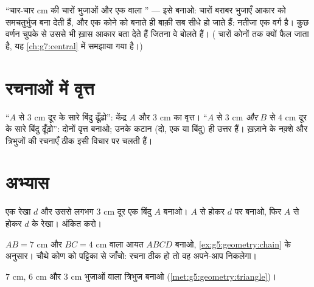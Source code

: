 \begin{example}[वर्णन से पहचानना]\label{ex:g5:geometry:recognize}
``चार-चार cm की चारों भुजाओं और एक  वाला '' ---
इसे बनाओ: चारों बराबर भुजाएँ आकार को समचतुर्भुज बना देती हैं, और
एक कोने को  बनाते ही बाक़ी सब सीधे हो जाते हैं: नतीजा एक
वर्ग है। कुछ वर्णन चुपके से उससे भी ख़ास आकार बता देते हैं जितना
वे बोलते हैं। ( चारों कोनों तक क्यों फैल जाता है, यह
\cref{ch:g7:central} में समझाया गया है।)
\end{example}

\section{रचनाओं में वृत्त}

\begin{example}[औज़ार के रूप में वृत्त]\label{ex:g5:geometry:circle}
``$A$ से $3$ cm दूर के सारे बिंदु ढूँढ़ो'': केंद्र $A$ और
 $3$ cm का वृत्त। ``$A$ से $3$ cm \emph{और} $B$ से
$4$ cm दूर के सारे बिंदु ढूँढ़ो'': दोनों वृत्त बनाओ; उनके कटान
(दो, एक या  बिंदु) ही उत्तर हैं। ख़ज़ाने के नक़्शे और
त्रिभुजों की रचनाएँ ठीक इसी विचार पर चलती हैं।
\end{example}

\section{अभ्यास}

\begin{exercise}[$\star$]\label{exo:g5:geometry:1}
एक रेखा $d$ और उससे लगभग $3$ cm दूर एक बिंदु $A$ बनाओ। $A$ से
होकर $d$ पर  बनाओ, फिर $A$ से होकर $d$ के  रेखा।
 अंकित करो।
\end{exercise}

\begin{exercise}[$\star$]\label{exo:g5:geometry:2}
$AB = 7$ cm और $BC = 4$ cm वाला आयत $ABCD$ बनाओ,
\cref{ex:g5:geometry:chain} के अनुसार। चौथे कोण को  पट्टिका
से जाँचो: रचना ठीक हो तो वह अपने-आप  निकलेगा।
\end{exercise}

\begin{exercise}[$\star$]\label{exo:g5:geometry:3}
$7$ cm, $6$ cm और $3$ cm भुजाओं वाला त्रिभुज बनाओ
(\cref{met:g5:geometry:triangle})।
\end{exercise}

